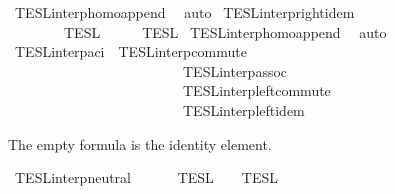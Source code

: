 \begin{isabellebody}
%
\isadelimproof
%
\endisadelimproof
%
\isatagproof
{}\isamarkupfalse%
\ TESL{\isacharunderscore}interp{\isacharunderscore}homo{\isacharunderscore}append\ \isamarkupfalse%
\ auto%
\endisatagproof
{\isafoldproof}%
%
\isadelimproof
\isanewline
%
\endisadelimproof
\isanewline
{}\isamarkupfalse%
\ TESL{\isacharunderscore}interp{\isacharunderscore}right{\isacharunderscore}idem{\isacharcolon}\isanewline
\ \ {\isacartoucheopen}{\isasymlbrakk}{\isasymlbrakk}\ {\isacharparenleft}{\isasymPhi}\ {\isacharat}\ {\isasymPhi}\ {\isacharat}\ {\isasymPhi}\ {\isasymrbrakk}{\isasymrbrakk}\isactrlsub T\isactrlsub E\isactrlsub S\isactrlsub L\ {\isacharequal}\ {\isasymlbrakk}{\isasymlbrakk}\ {\isasymPhi}\ {\isacharat}\ {\isasymPhi}\ {\isasymrbrakk}{\isasymrbrakk}\isactrlsub T\isactrlsub E\isactrlsub S\isactrlsub L{\isacartoucheclose}\isanewline
%
\isadelimproof
%
\endisadelimproof
%
\isatagproof
{}\isamarkupfalse%
\ TESL{\isacharunderscore}interp{\isacharunderscore}homo{\isacharunderscore}append\ \isamarkupfalse%
\ auto%
\endisatagproof
{\isafoldproof}%
%
\isadelimproof
\isanewline
%
\endisadelimproof
\isanewline
{}\isamarkupfalse%
\ TESL{\isacharunderscore}interp{\isacharunderscore}aci\ {\isacharequal}\ TESL{\isacharunderscore}interp{\isacharunderscore}commute\isanewline
\ \ \ \ \ \ \ \ \ \ \ \ \ \ \ \ \ \ \ \ \ \ \ \ \ TESL{\isacharunderscore}interp{\isacharunderscore}assoc\isanewline
\ \ \ \ \ \ \ \ \ \ \ \ \ \ \ \ \ \ \ \ \ \ \ \ \ TESL{\isacharunderscore}interp{\isacharunderscore}left{\isacharunderscore}commute\isanewline
\ \ \ \ \ \ \ \ \ \ \ \ \ \ \ \ \ \ \ \ \ \ \ \ \ TESL{\isacharunderscore}interp{\isacharunderscore}left{\isacharunderscore}idem%
\begin{isamarkuptext}%
The empty formula is the identity element.%
\end{isamarkuptext}\isamarkuptrue%
\isamarkupfalse%
\ TESL{\isacharunderscore}interp{\isacharunderscore}neutral{}{\isacharcolon}\isanewline
\ \ {\isacartoucheopen}{\isasymlbrakk}{\isasymlbrakk}\ {\isacharbrackleft}{\isacharbrackright}\ {\isacharat}\ {\isasymPhi}\ {\isasymrbrakk}{\isasymrbrakk}\isactrlsub T\isactrlsub E\isactrlsub S\isactrlsub L\ {\isacharequal}\ {\isasymlbrakk}{\isasymlbrakk}\ {\isasymPhi}\ {\isasymrbrakk}{\isasymrbrakk}\isactrlsub T\isactrlsub E\isactrlsub S\isactrlsub L{\isacartoucheclose}\isanewline

\end{isabellebody}
